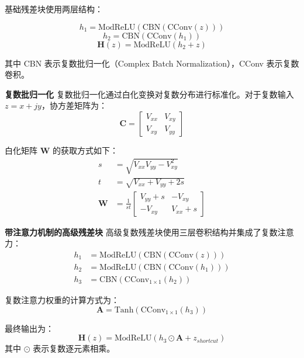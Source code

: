 \documentclass{article}
\begin{document}
基础残差块使用两层结构：

\begin{equation}
h_1 = \text{ModReLU}(\text{CBN}(\text{CConv}(z)))
\end{equation}
\begin{equation}
h_2 = \text{CBN}(\text{CConv}(h_1))
\end{equation}
\begin{equation}
\mathbf{H}(z) = \text{ModReLU}(h_2 + z)
\end{equation}

其中 CBN 表示复数批归一化（Complex Batch Normalization），CConv 表示复数卷积。

\textbf{复数批归一化} 复数批归一化通过白化变换对复数分布进行标准化。对于复数输入 $z = x + jy$，协方差矩阵为：
\begin{equation}
\mathbf{C} = \begin{bmatrix} V_{xx} & V_{xy} \\ V_{xy} & V_{yy} \end{bmatrix}
\end{equation}

白化矩阵 $\mathbf{W}$ 的获取方式如下：
\begin{align}
s &= \sqrt{V_{xx}V_{yy} - V_{xy}^2} \\
t &= \sqrt{V_{xx} + V_{yy} + 2s} \\
\mathbf{W} &= \frac{1}{st}\begin{bmatrix} V_{yy} + s & -V_{xy} \\ -V_{xy} & V_{xx} + s \end{bmatrix}
\end{align}

\textbf{带注意力机制的高级残差块} 高级复数残差块使用三层卷积结构并集成了复数注意力：
\begin{align}
h_1 &= \text{ModReLU}(\text{CBN}(\text{CConv}(z))) \\
h_2 &= \text{ModReLU}(\text{CBN}(\text{CConv}(h_1))) \\
h_3 &= \text{CBN}(\text{CConv}_{1 \times 1}(h_2))
\end{align}

复数注意力权重的计算方式为：
\begin{equation}
\mathbf{A} = \text{Tanh}(\text{CConv}_{1 \times 1}(h_3))
\end{equation}

最终输出为：
\begin{equation}
\mathbf{H}(z) = \text{ModReLU}(h_3 \odot \mathbf{A} + z_{shortcut})
\end{equation}
其中 $\odot$ 表示复数逐元素相乘。
\end{document}
